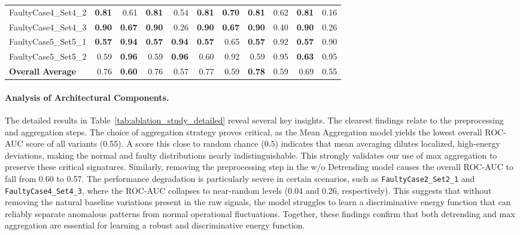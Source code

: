 \documentclass{article}
\begin{document}
\begin{table}[h!]
{\begin{tabular}{lrr|rr|rr|rr|rr}
FaultyCase4\_Set4\_2 & \textbf{0.81} & 0.61 & \textbf{0.81} & 0.54 & \textbf{0.81} & \textbf{0.70} & \textbf{0.81} & 0.62 & \textbf{0.81} & 0.16 \\
FaultyCase4\_Set4\_3 & \textbf{0.90} & \textbf{0.67} & \textbf{0.90} & 0.26 & \textbf{0.90} & \textbf{0.67} & \textbf{0.90} & 0.40 & \textbf{0.90} & 0.26 \\
FaultyCase5\_Set5\_1 & \textbf{0.57} & \textbf{0.94} & \textbf{0.57} & \textbf{0.94} & \textbf{0.57} & 0.65 & \textbf{0.57} & 0.92 & \textbf{0.57} & 0.90 \\
FaultyCase5\_Set5\_2 & 0.59 & \textbf{0.96} & 0.59 & \textbf{0.96} & 0.60 & 0.92 & 0.59 & 0.95 & \textbf{0.63} & 0.95 \\
\midrule
\textbf{Overall Average} & 0.76 & \textbf{0.60} & 0.76 & 0.57 & 0.77 & 0.59 & \textbf{0.78} & 0.59 & 0.69 & 0.55 \\
\bottomrule
\end{tabular}}
\end{table} 

\paragraph{Analysis of Architectural Components.} The detailed results in Table~\ref{tab:ablation_study_detailed} reveal several key insights. The clearest findings relate to the preprocessing and aggregation steps. The choice of aggregation strategy proves critical, as the Mean Aggregation model yields the lowest overall ROC-AUC score of all variants (0.55). A score this close to random chance (0.5) indicates that mean averaging dilutes localized, high-energy deviations, making the normal and faulty distributions nearly indistinguishable. This strongly validates our use of max aggregation to preserve these critical signatures. Similarly, removing the preprocessing step in the w/o Detrending model causes the overall ROC-AUC to fall from 0.60 to 0.57. The performance degradation is particularly severe in certain scenarios, such as \texttt{FaultyCase2\_Set2\_1} and \texttt{FaultyCase4\_Set4\_3}, where the ROC-AUC collapses to near-random levels (0.04 and 0.26, respectively). This suggests that without removing the natural baseline variations present in the raw signals, the model struggles to learn a discriminative energy function that can reliably separate anomalous patterns from normal operational fluctuations. Together, these findings confirm that both detrending and max aggregation are essential for learning a robust and discriminative energy function.
\end{document}
